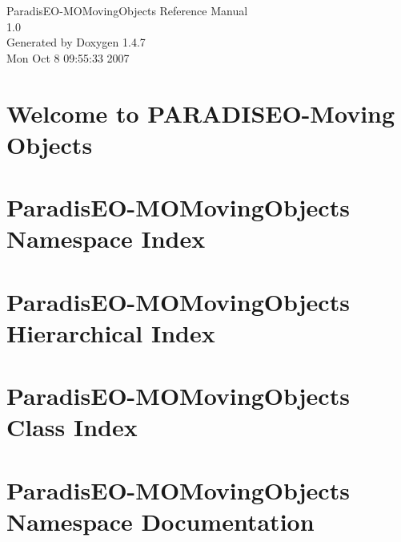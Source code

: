 \documentclass[a4paper]{book}
\begin{document}
\begin{titlepage}
\vspace*{7cm}
\begin{center}
{\Large Paradis\-EO-MOMoving\-Objects Reference Manual\\[1ex]\large 1.0 }\\
\vspace*{1cm}
{\large Generated by Doxygen 1.4.7}\\
\vspace*{0.5cm}
{\small Mon Oct 8 09:55:33 2007}\\
\end{center}
\end{titlepage}
\clearemptydoublepage
{}
\tableofcontents
\clearemptydoublepage
{}
\chapter{Welcome to PARADISEO-Moving Objects }
\label{index}
\chapter{Paradis\-EO-MOMoving\-Objects Namespace Index}

\chapter{Paradis\-EO-MOMoving\-Objects Hierarchical Index}

\chapter{Paradis\-EO-MOMoving\-Objects Class Index}

\chapter{Paradis\-EO-MOMoving\-Objects Namespace Documentation}

\end{document}
